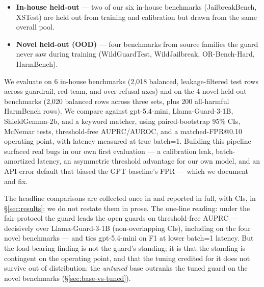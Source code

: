 \documentclass[sigconf,nonacm]{acmart}
\begin{document}
\begin{itemize}
  \item \textbf{In-house held-out} --- two of our six in-house benchmarks (JailbreakBench, XSTest) are held out from training and calibration but drawn from the same overall pool.
  \item \textbf{Novel held-out (OOD)} --- four benchmarks from source families the guard never saw during training (WildGuardTest, WildJailbreak, OR-Bench-Hard, HarmBench).
\end{itemize}

We evaluate on 6 in-house benchmarks (2,018 balanced, leakage-filtered test rows across guardrail, red-team, and over-refusal axes) and on the 4 novel held-out benchmarks (2,020 balanced rows across three sets, plus 200 all-harmful HarmBench rows). We compare against gpt-5.4-mini, Llama-Guard-3-1B, ShieldGemma-2b, and a keyword matcher, using paired-bootstrap 95\% CIs, McNemar tests, threshold-free AUPRC/AUROC, and a matched-FPR@0.10 operating point, with latency measured at true batch=1. Building this pipeline surfaced real bugs in our own first evaluation --- a calibration leak, batch-amortized latency, an asymmetric threshold advantage for our own model, and an API-error default that biased the GPT baseline's FPR --- which we document and fix.

The headline comparisons are collected once in  and reported in full, with CIs, in \S\ref{sec:results}; we do not restate them in prose. The one-line reading: under the fair protocol the guard leads the open guards on threshold-free AUPRC --- decisively over Llama-Guard-3-1B (non-overlapping CIs), including on the four novel benchmarks --- and ties gpt-5.4-mini on F1 at lower batch=1 latency. But the load-bearing finding is not the guard's standing; it is that the standing is contingent on the operating point, and that the tuning credited for it does not survive out of distribution: the \emph{untuned} base outranks the tuned guard on the novel benchmarks (\S\ref{sec:base-vs-tuned}).
\end{document}
